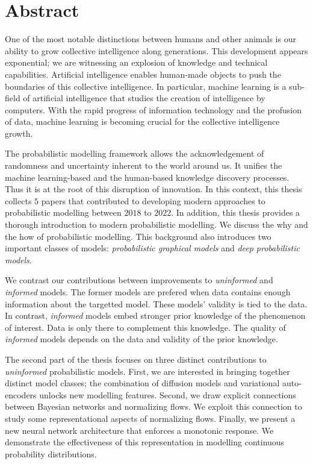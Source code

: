 
\chapter*{Abstract}
One of the most notable distinctions between humans and other animals is our ability to grow collective intelligence along generations. This development appears exponential; we are witnessing an explosion of knowledge and technical capabilities. Artificial intelligence enables human-made objects to push the boundaries of this collective intelligence. In particular, machine learning is a sub-field of artificial intelligence that studies the creation of intelligence by computers. With the rapid progress of information technology and the profusion of data, machine learning is becoming crucial for the collective intelligence growth.

The probabilistic modelling framework allows the acknowledgement of randomness and uncertainty inherent to the world around us. It unifies the machine learning-based and the human-based knowledge discovery processes.
Thus it is at the root of this disruption of innovation.
In this context, this thesis collects $5$ papers that contributed to developing modern approaches to probabilistic modelling between $2018$ to $2022$.
In addition, this thesis provides a thorough introduction to modern probabilistic modelling. We discuss the why and the how of probabilistic modelling. This background also introduces two important classes of models: \textit{probabilistic graphical models} and \textit{deep probabilistic models}.

We contrast our contributions between improvements to \textit{uninformed} and \textit{informed} models. The former models are prefered when data contains enough information about the targetted model. These models' validity is tied to the data. In contrast, \textit{informed} models embed stronger prior knowledge of the phenomenon of interest. Data is only there to complement this knowledge. The quality of \textit{informed} models depends on the data and validity of the prior knowledge.

The second part of the thesis focuses on three distinct contributions to \textit{uninformed} probabilistic models. First, we are interested in bringing together distinct model classes; the combination of diffusion models and variational auto-encoders unlocks new modelling features. Second, we draw explicit connections between Bayesian networks and normalizing flows. We exploit this connection to study some representational aspects of normalizing flows. Finally, we present a new neural network architecture that enforces a monotonic response. We demonstrate the effectiveness of this representation in modelling continuous probability distributions.

